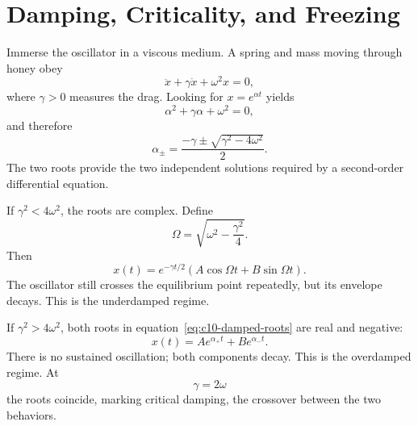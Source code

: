 \section{Damping, Criticality, and Freezing}

Immerse the oscillator in a viscous medium. A spring and mass moving through honey obey
\begin{equation}
\ddot x+\gamma\dot x+\omega^2x=0,
\label{eq:c10-damped}
\end{equation}
where \(\gamma>0\) measures the drag. Looking for \(x=e^{\alpha t}\) yields
\begin{equation}
\alpha^2+\gamma\alpha+\omega^2=0,
\end{equation}
and therefore
\begin{equation}
\alpha_\pm
=\frac{-\gamma\pm\sqrt{\gamma^2-4\omega^2}}{2}.
\label{eq:c10-damped-roots}
\end{equation}
The two roots provide the two independent solutions required by a second-order differential equation.

\begin{classroomqa}
\end{classroomqa}

If \(\gamma^2<4\omega^2\), the roots are complex. Define
\[
\Omega=\sqrt{\omega^2-\frac{\gamma^2}{4}}.
\]
Then
\begin{equation}
x(t)=e^{-\gamma t/2}
\left(A\cos\Omega t+B\sin\Omega t\right).
\label{eq:c10-underdamped}
\end{equation}
The oscillator still crosses the equilibrium point repeatedly, but its envelope decays. This is the underdamped regime.

If \(\gamma^2>4\omega^2\), both roots in equation~\eqref{eq:c10-damped-roots} are real and negative:
\begin{equation}
x(t)=A e^{\alpha_+t}+B e^{\alpha_-t}.
\label{eq:c10-overdamped}
\end{equation}
There is no sustained oscillation; both components decay. This is the overdamped regime. At
\begin{equation}
\gamma=2\omega
\label{eq:c10-critical}
\end{equation}
the roots coincide, marking critical damping, the crossover between the two behaviors.

